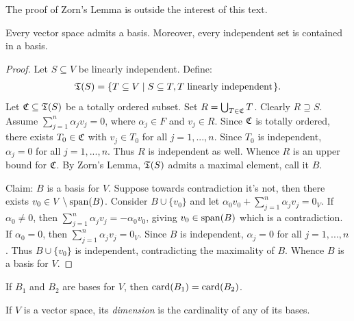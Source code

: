     The proof of Zorn's Lemma is outside the interest of this text. 

    \begin{theorem}
        Every vector space admits a basis. Moreover, every independent set is contained in a basis.
    \end{theorem}
        \begin{proof}
            Let $S \subseteq V$ be linearly independent. Define:
                \begin{equation*}
                \begin{split}
                    \fT(S) = \{T \subseteq V \mid S \subseteq T, T \hspace{-3pt}\mtext{linearly independent}\hspace{-5pt}\}.
                \end{split}
                \end{equation*}
            Let $\mathfrak{C} \subseteq \mathfrak{T}(S)$ be a totally ordered subset. Set $R = \bigcup_{T \in \mathfrak{C}} T$. Clearly $R \supseteq S$. Assume $\sum_{j = 1}^n \alpha_j v_j = 0$, where $\alpha_j \in F$ and $v_j \in R$. Since $\mathfrak{C}$ is totally ordered, there exists $T_0 \in \mathfrak{C}$ with $v_j \in T_0$ for all $j = 1,...,n$. Since $T_0$ is independent, $\alpha_j = 0$ for all $j = 1,...,n$. Thus $R$ is independent as well. Whence $R$ is an upper bound for $\mathfrak{C}$. By Zorn's Lemma, $\mathfrak{T}(S)$ admits a maximal element, call it $B$.

            Claim: $B$ is a basis for $V$. Suppose towards contradiction it's not, then there exists $v_0 \in V \setminus \operatorname{span}(B)$. Consider $B \cup \{v_0\}$ and let $\alpha_0 v_0 + \sum_{j = 1}^n \alpha_j v_j = 0_V$. If $\alpha_0 \neq 0$, then $\sum_{j = 1}^n \alpha_j v_j = -\alpha_0 v_0 $, giving $v_0 \in \operatorname{span}(B)$ which is a contradiction. If $\alpha_0 = 0$, then $\sum_{j = 1}^n \alpha_j v_j = 0_V$. Since $B$ is independent, $\alpha_j = 0$ for all $j =1,...,n$. Thus $B \cup \{v_0\}$ is independent, contradicting the maximality of $B$. Whence $B$ is a basis for $V$.
        \end{proof}

    \begin{theorem}
        If $B_1$ and $B_2$ are bases for $V$, then $\operatorname{card}(B_1) = \operatorname{card}(B_2)$.
    \end{theorem}

    \begin{definition}
        If $V$ is a vector space, its \textit{dimension} is the cardinality of any of its bases.
    \end{definition}

